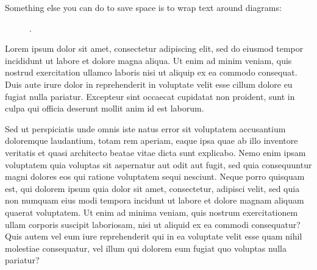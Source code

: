 \documentclass[11pt]{article} %
\begin{document}
Something else you can do to save space is to wrap text around diagrams:

\begin{figure} %
  \vspace{-1em} %
  
  \ex.  \leavevmode\vadjust{\vspace{-\baselineskip}}\newline %

   \vspace{-1em} %
\end{figure}

Lorem ipsum dolor sit amet, consectetur adipiscing elit, sed do eiusmod tempor incididunt ut labore et dolore magna aliqua. Ut enim ad minim veniam, quis nostrud exercitation ullamco laboris nisi ut aliquip ex ea commodo consequat. Duis aute irure dolor in reprehenderit in voluptate velit esse cillum dolore eu fugiat nulla pariatur. Excepteur sint occaecat cupidatat non proident, sunt in culpa qui officia deserunt mollit anim id est laborum.

Sed ut perspiciatis unde omnis iste natus error sit voluptatem accusantium doloremque laudantium, totam rem aperiam, eaque ipsa quae ab illo inventore veritatis et quasi architecto beatae vitae dicta sunt explicabo. Nemo enim ipsam voluptatem quia voluptas sit aspernatur aut odit aut fugit, sed quia consequuntur magni dolores eos qui ratione voluptatem sequi nesciunt. Neque porro quisquam est, qui dolorem ipsum quia dolor sit amet, consectetur, adipisci velit, sed quia non numquam eius modi tempora incidunt ut labore et dolore magnam aliquam quaerat voluptatem. Ut enim ad minima veniam, quis nostrum exercitationem ullam corporis suscipit laboriosam, nisi ut aliquid ex ea commodi consequatur? Quis autem vel eum iure reprehenderit qui in ea voluptate velit esse quam nihil molestiae consequatur, vel illum qui dolorem eum fugiat quo voluptas nulla pariatur?
\end{document}
